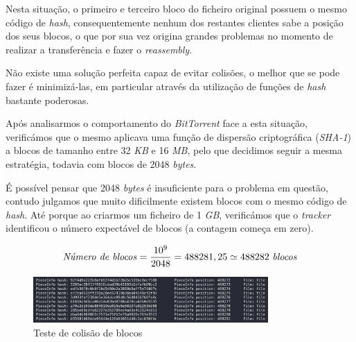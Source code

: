         Nesta situação, o primeiro e terceiro bloco do ficheiro original possuem o mesmo código de \textit{hash}, consequentemente nenhum dos restantes clientes sabe a posição dos seus blocos, o que por sua vez origina grandes problemas no momento de realizar a transferência e fazer o \textit{reassembly}.

        Não existe uma solução perfeita capaz de evitar colisões, o melhor que se pode fazer é minimizá-las, em particular através da utilização de funções de \textit{hash} bastante poderosas.

        Após analisarmos o comportamento do \textit{BitTorrent} face a esta situação, verificámos que o mesmo aplicava uma função de dispersão criptográfica (\textit{SHA-1}) a blocos de tamanho entre 32 \textit{KB} e 16 \textit{MB}, pelo que decidimos seguir a mesma estratégia, todavia com blocos de 2048 \textit{bytes}.

        É possível pensar que 2048 \textit{bytes} é insuficiente para o problema em questão, contudo julgamos que muito dificilmente existem blocos com o mesmo código de \textit{hash}. Até porque ao criarmos um ficheiro de 1 \textit{GB}, verificámos que o \textit{tracker} identificou o número expectável de blocos (a contagem começa em zero).

        \[
            \text{\textit{Número de blocos}} 
                = \dfrac
                    {10^{9}}
                    {2048}
                = 488281,25
                \simeq 488282 ~\text{\textit{blocos}}
        \]

        \begin{figure}[hb!]
            \centering
            \includegraphics[width=0.8\textwidth]{Imagens/Blocos/teste de colisoes.png}
            \caption{Teste de colisão de blocos}
        \end{figure}